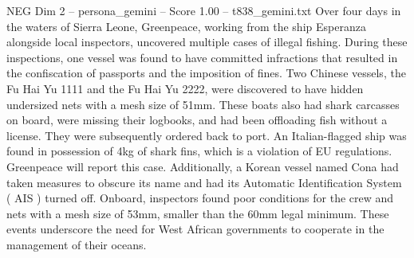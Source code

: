 \begin{textsample}{NEG Dim 2 – persona\_gemini – Score 1.00 – t838\_gemini.txt}  \label{ex:f2_neg_013}
Over four days in the waters of Sierra Leone, Greenpeace, working from the ship Esperanza alongside local inspectors, uncovered multiple cases of illegal fishing.
During these inspections, one vessel was found to have committed infractions that resulted in the confiscation of passports and the imposition of fines.
Two Chinese vessels, the Fu Hai Yu 1111 and the Fu Hai Yu 2222, were discovered to have hidden undersized nets with a mesh size of 51mm.
These boats also had shark carcasses on board, were missing their logbooks, and had been offloading fish without a license.
They were subsequently ordered back to port.
An Italian-flagged ship was found in possession of 4kg of shark fins, which is a violation of EU regulations.
Greenpeace will report this case.
Additionally, a Korean vessel named Cona had taken measures to obscure its name and had its Automatic Identification System ( AIS ) turned off.
Onboard, inspectors found poor conditions for the crew and nets with a mesh size of 53mm, smaller than the 60mm legal minimum.
These events underscore the need for West African governments to cooperate in the management of their oceans.

\end{textsample}
